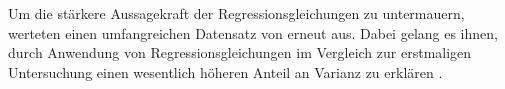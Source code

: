 Um die stärkere Aussagekraft der Regressionsgleichungen zu untermauern, werteten \textcite[S. 18ff.]{edwards:1993b} einen umfangreichen Datensatz von \textcite[S. 9ff.]{mechanismsOfJobStressAndStrain:1982} erneut aus. Dabei gelang es ihnen, durch Anwendung von Regressionsgleichungen im Vergleich zur erstmaligen Untersuchung einen wesentlich höheren Anteil an Varianz zu erklären \cite[S. 8]{su:2015}.
